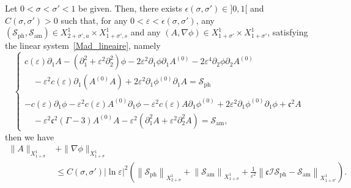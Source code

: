 \documentclass[AHL,Unicode,longabstracts,published]{cedram}
\newcommand*\p{\partial}
\newcommand{\amm}{\mathrm{am}}
\newcommand{\phl}{\mathrm{ph}}
\newcommand*\BI{\mathcal{I}}
\newcommand*\BS{\mathcal{S}}
\newcommand*\cs{{\mathfrak c}}
\newcommand*\ls{\leqslant }
\newcommand*\e{\varepsilon}
\newcommand*\ep{\epsilon}
\newcommand*\lne{\lvert \ln \varepsilon \rvert}
\newcommand*\s{\sigma}
\begin{document}
\begin{lemm}\label{esti-apriori_plan}
Let $ 0 < \s < \s' < 1 $ be given. Then, there exists $ \ep (\s, \s') \in]0,1[$ and $ C (\s,\s') > 0 $ such that, for any $ 0 < \e < \ep(\s, \s') $, any $ (\BS_{\phl}, \BS_{\amm}) \in X^{1}_{2+\s', a} \times X^{1}_{1+\s', s} $ and any $ (A, \nabla \phi) \in X^{1}_{ 1+\s'} \times X^{1}_{ 1+ \s'} $, satisfying the linear system~\eqref{Mad_lineaire}, namely
\begin{equation*}
\left\{
\begin{array}{ll}
c(\e) \p_{1} A -\left(\p_{1}^2 + \e^2 \p^2_{2}\right) \phi - 2 \e^2 \p_{1} \phi \p_{1} A^{(0)} - 2 \e^4 \p_{2} \phi \p_{2} A^{(0)}
\\
\quad - \e^2 c(\e) \p_1 (A^{(0)} A) + 2 \e^2 \p_{1} \phi^{(0)} \p_{1} A = \BS_{\phl} \\ \ \\
- c(\e) \p_{1} \phi - \e^2 c(\e) A^{(0)} \p_1 \phi - \e^2 c(\e) A \p_1 \phi^{(0)} + 2 \e^2 \p_{1} \phi^{(0)} \p_{1} \phi + \cs^2 A
\\
\quad - \e^2 \cs^2 (\Gamma -3) A^{(0)} A - \e^2 \left(\p_{1}^2 A + \e^2 \p_{2}^2 A\right) = \BS_{\amm},
\end{array}\right.
\end{equation*}
then we have
\begin{align*}
\| A \|_{ X^1_{ 1+ \s} } & + \| \nabla \phi \|_{ X^1_{1+ \s} }
\\ & \ls C (\s, \s') \lne^2
\left(
\left\| \BS_{\phl} \right\|_{ X^{1}_{ 2+\s } } + \left\| \BS_{\amm} \right\|_{ X^{ 1}_{1+\s} } + \frac{1}{\e^2} \left\| \cs \BI \BS_{\phl} - \BS_{\amm} \right\|_{ X^{1}_{1+\s'}}
\right).
\end{align*}
\end{lemm}
\end{document}
